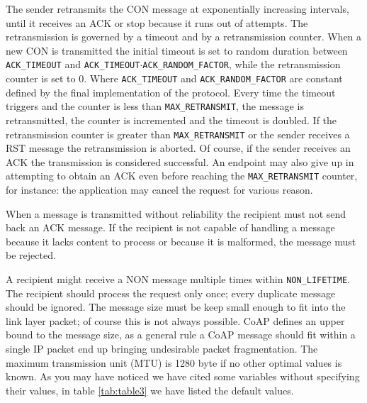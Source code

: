 	The sender retransmits the CON message at exponentially increasing intervals, 
	until it receives an ACK or stop because it runs out of attempts.\newline
	The retransmission is governed by a timeout and by a retransmission counter.\newline
	When a new CON is transmitted the initial timeout is set to random duration between
	\texttt{ACK\_TIMEOUT} 
	and \texttt{ACK\_TIMEOUT$\cdot$ACK\_RANDOM\_FACTOR}, while the retransmission counter is set to 0.\newline
	Where \texttt{ACK\_TIMEOUT} and \texttt{ACK\_RANDOM\_FACTOR} are constant defined by the final implementation of the protocol.\newline
	Every time the timeout triggers and the counter is less than \texttt{MAX\_RETRANSMIT}, the message is retransmitted, the counter is incremented and the timeout is doubled.\newline
	If the retransmission counter is greater than \texttt{MAX\_RETRANSMIT} or the sender receives a RST message the retransmission is aborted.\newline
	Of course, if the sender receives an ACK the transmission is considered successful.\newline
	An endpoint may also give up in attempting to obtain an ACK even before reaching the \texttt{MAX\_RETRANSMIT} counter, for instance: the application may cancel the request for various reason.\newline
	
	When a message is transmitted without reliability the recipient must not send back an ACK message.\newline
	If the recipient is not capable of handling a message because it lacks content to process or because it is malformed, the message must be rejected.\newline
	
	A recipient might receive a NON message multiple times within \texttt{NON\_LIFETIME}.\newline
	The recipient should process the request only once; every duplicate message should be ignored.\newline
	The message size must be keep small enough to fit into the link layer packet; of course this is not always possible.\newline
	CoAP defines an upper bound to the message size, as a general rule a CoAP message should fit within a single IP packet end up bringing undesirable packet fragmentation.\newline
	The maximum transmission unit (MTU) is 1280 byte if no other optimal values is known.\newline
	As you may have noticed we have cited some variables without specifying their values, in table \ref{tab:table3} we have listed the default values.\newline
	
